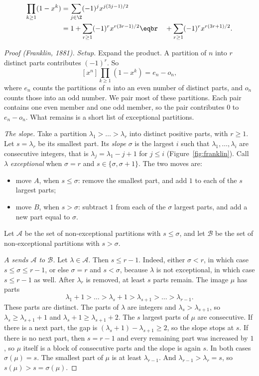 \begin{theorem}\label{thm:pentagonal}
\[
\begin{aligned}\prod_{k\ge1}(1-x^k)&=\sum_{j\in\Z}(-1)^jx^{j(3j-1)/2}\\&=1+\sum_{r\ge1}(-1)^rx^{r(3r-1)/2}\eqbr\quad+\sum_{r\ge1}(-1)^rx^{r(3r+1)/2}.\end{aligned}
\]
\end{theorem}
\begin{proof}[Proof (Franklin, 1881)]
\emph{Setup.}
Expand the product. A partition of $n$ into $r$ distinct parts contributes $(-1)^r$. So
\[
[x^n]\prod_{k\ge1}(1-x^k)=e_n-o_n,
\]
where $e_n$ counts the partitions of $n$ into an even number of distinct parts, and $o_n$ counts those into an odd number. We pair most of these partitions. Each pair contains one even member and one odd member, so the pair contributes $0$ to $e_n-o_n$. What remains is a short list of exceptional partitions.

\emph{The slope.}
Take a partition $\lambda_1>\dots>\lambda_r$ into distinct positive parts, with $r\ge1$. Let $s=\lambda_r$ be its smallest part. Its \emph{slope} $\sigma$ is the largest $i$ such that $\lambda_1,\dots,\lambda_i$ are consecutive integers, that is $\lambda_j=\lambda_1-j+1$ for $j\le i$ (Figure~\ref{fig:franklin}). Call $\lambda$ \emph{exceptional} when $\sigma=r$ and $s\in\{\sigma,\sigma+1\}$. The two moves are:
\begin{itemize}
\item move $A$, when $s\le\sigma$: remove the smallest part, and add $1$ to each of the $s$ largest parts;
\item move $B$, when $s>\sigma$: subtract $1$ from each of the $\sigma$ largest parts, and add a new part equal to $\sigma$.
\end{itemize}
Let $\mathcal A$ be the set of non-exceptional partitions with $s\le\sigma$, and let $\mathcal B$ be the set of non-exceptional partitions with $s>\sigma$.

\emph{$A$ sends $\mathcal A$ to $\mathcal B$.}
Let $\lambda\in\mathcal A$. Then $s\le r-1$. Indeed, either $\sigma<r$, in which case $s\le\sigma\le r-1$, or else $\sigma=r$ and $s<\sigma$, because $\lambda$ is not exceptional, in which case $s\le r-1$ as well. After $\lambda_r$ is removed, at least $s$ parts remain. The image $\mu$ has parts
\[
\lambda_1+1>\dots>\lambda_s+1>\lambda_{s+1}>\dots>\lambda_{r-1}.
\]
These parts are distinct. The parts of $\lambda$ are integers and $\lambda_s>\lambda_{s+1}$, so $\lambda_s\ge\lambda_{s+1}+1$ and $\lambda_s+1\ge\lambda_{s+1}+2$. The $s$ largest parts of $\mu$ are consecutive. If there is a next part, the gap is $(\lambda_s+1)-\lambda_{s+1}\ge2$, so the slope stops at $s$. If there is no next part, then $s=r-1$ and every remaining part was increased by $1$, so $\mu$ itself is a block of consecutive parts and the slope is again $s$. In both cases $\sigma(\mu)=s$. The smallest part of $\mu$ is at least $\lambda_{r-1}$. And $\lambda_{r-1}>\lambda_r=s$, so $s(\mu)>s=\sigma(\mu)$.


\end{proof}
